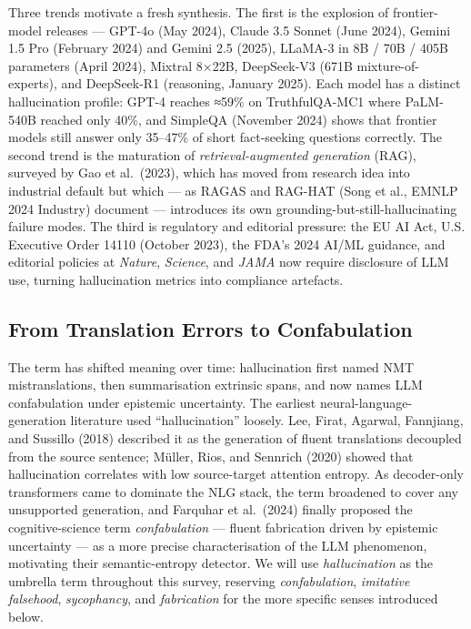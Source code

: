 \documentclass{article}
\begin{document}
Three trends motivate a fresh synthesis. The first is the explosion of frontier-model releases --- GPT-4o (May 2024), Claude 3.5 Sonnet (June 2024), Gemini 1.5 Pro (February 2024) and Gemini 2.5 (2025), LLaMA-3 in 8B / 70B / 405B parameters (April 2024), Mixtral 8×22B, DeepSeek-V3 (671B mixture-of-experts), and DeepSeek-R1 (reasoning, January 2025). Each model has a distinct hallucination profile: GPT-4 reaches ≈59\% on TruthfulQA-MC1 where PaLM-540B reached only 40\%, and SimpleQA (November 2024) shows that frontier models still answer only 35--47\% of short fact-seeking questions correctly. The second trend is the maturation of \emph{retrieval-augmented generation} (RAG), surveyed by Gao et al.~(2023), which has moved from research idea into industrial default but which --- as RAGAS \citep{es2024ragasautomatedeval} and RAG-HAT (Song et al., EMNLP 2024 Industry) document --- introduces its own grounding-but-still-hallucinating failure modes. The third is regulatory and editorial pressure: the EU AI Act, U.S. Executive Order 14110 (October 2023), the FDA's 2024 AI/ML guidance, and editorial policies at \emph{Nature}, \emph{Science}, and \emph{JAMA} now require disclosure of LLM use, turning hallucination metrics into compliance artefacts.

\subsection{From Translation Errors to Confabulation}\label{from-translation-errors-to-confabulation}

The term has shifted meaning over time: hallucination first named NMT mistranslations, then summarisation extrinsic spans, and now names LLM confabulation under epistemic uncertainty. The earliest neural-language-generation literature used ``hallucination'' loosely. Lee, Firat, Agarwal, Fannjiang, and Sussillo (2018) described it as the generation of fluent translations decoupled from the source sentence; Müller, Rios, and Sennrich (2020) showed that hallucination correlates with low source-target attention entropy. As decoder-only transformers came to dominate the NLG stack, the term broadened to cover any unsupported generation, and Farquhar et al.~(2024) finally proposed the cognitive-science term \emph{confabulation} --- fluent fabrication driven by epistemic uncertainty --- as a more precise characterisation of the LLM phenomenon, motivating their semantic-entropy detector. We will use \emph{hallucination} as the umbrella term throughout this survey, reserving \emph{confabulation}, \emph{imitative falsehood}, \emph{sycophancy}, and \emph{fabrication} for the more specific senses introduced below.
\end{document}
